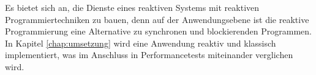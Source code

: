 Es bietet sich an, die Dienste eines reaktiven Systems mit reaktiven Programmiertechniken zu bauen, denn auf der Anwendungsebene ist die reaktive Programmierung eine Alternative zu synchronen und blockierenden Programmen. In Kapitel \ref{chap:umsetzung} wird eine Anwendung reaktiv und klassisch implementiert, was im Anschluss in Performancetests miteinander verglichen wird.   